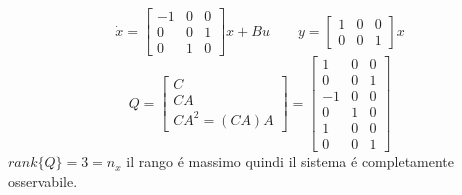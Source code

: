 \documentclass[../main.tex]{subfiles}
\begin{document}
		\begin{mdframed}[style=Exercise]
			\begin{Exercise}[title={Calcolare $ X_{NO} $}, difficulty=1]
				\[
					\dot x =
					\begin{bmatrix}
						-1 & 0 & 0\\
						0 & 0 & 1\\
						0 & 1 & 0
					\end{bmatrix} x + Bu
					\qquad
					y =
					\begin{bmatrix}
						1 & 0 & 0\\
						0 & 0 & 1
					\end{bmatrix} x
				\]
				\[
					Q =
					\begin{bmatrix}
						C\\
						CA\\
						CA^2 = (CA)A
					\end{bmatrix} =
					\begin{bmatrix}
						1 & 0 & 0\\
						0 & 0 & 1\\
						\hline
						-1 & 0 & 0\\
						0 & 1 & 0\\
						\hline
						1 & 0 & 0\\
						0 & 0 & 1
					\end{bmatrix}
				\]
				$ rank\{Q\} = 3 = n_x $ il rango \'e massimo quindi il sistema \'e completamente osservabile.
				

\end{Exercise}
\end{mdframed}
\end{document}
